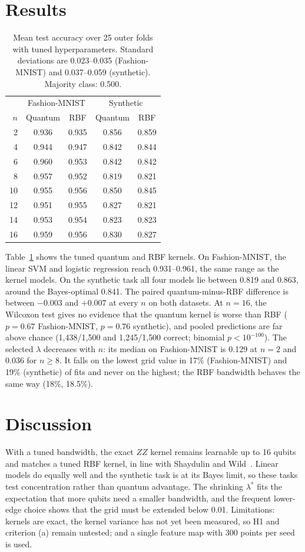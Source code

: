 \documentclass[conference]{IEEEtran}
\begin{document}
\section{Results}
\begin{table}[t]
\centering
\caption{Mean test accuracy over 25 outer folds with tuned hyperparameters. Standard deviations are 0.023--0.035 (Fashion-MNIST) and 0.037--0.059 (synthetic). Majority class: 0.500.}
\label{tab:accuracy}
\setlength{\tabcolsep}{6pt}
\begin{tabular}{rcccc}
\toprule
& \multicolumn{2}{c}{Fashion-MNIST} & \multicolumn{2}{c}{Synthetic} \\
$n$ & Quantum & RBF & Quantum & RBF \\
\midrule
2  & 0.936 & 0.935 & 0.856 & 0.859 \\
4  & 0.944 & 0.947 & 0.842 & 0.844 \\
6  & 0.960 & 0.953 & 0.842 & 0.842 \\
8  & 0.957 & 0.952 & 0.819 & 0.821 \\
10 & 0.955 & 0.956 & 0.850 & 0.845 \\
12 & 0.951 & 0.955 & 0.827 & 0.821 \\
14 & 0.953 & 0.954 & 0.823 & 0.823 \\
16 & 0.959 & 0.956 & 0.830 & 0.827 \\
\bottomrule
\end{tabular}
\end{table}

Table~\ref{tab:accuracy} shows the tuned quantum and RBF kernels. On Fashion-MNIST, the linear SVM and logistic regression reach 0.931--0.961, the same range as the kernel models. On the synthetic task all four models lie between 0.819 and 0.863, around the Bayes-optimal 0.841. The paired quantum-minus-RBF difference is between $-0.003$ and $+0.007$ at every $n$ on both datasets. At $n=16$, the Wilcoxon test gives no evidence that the quantum kernel is worse than RBF ($p=0.67$ Fashion-MNIST, $p=0.76$ synthetic), and pooled predictions are far above chance (1{,}438/1{,}500 and 1{,}245/1{,}500 correct; binomial $p<10^{-100}$). The selected $\lambda$ decreases with $n$: its median on Fashion-MNIST is 0.129 at $n=2$ and 0.036 for $n\geq8$. It falls on the lowest grid value in 17\% (Fashion-MNIST) and 19\% (synthetic) of fits and never on the highest; the RBF bandwidth behaves the same way (18\%, 18.5\%).

\section{Discussion}
With a tuned bandwidth, the exact $ZZ$ kernel remains learnable up to 16 qubits and matches a tuned RBF kernel, in line with Shaydulin and Wild~\cite{shaydulin2022bandwidth}. Linear models do equally well and the synthetic task is at its Bayes limit, so these tasks test concentration rather than quantum advantage. The shrinking $\lambda^{*}$ fits the expectation that more qubits need a smaller bandwidth, and the frequent lower-edge choice shows that the grid must be extended below 0.01. Limitations: kernels are exact, the kernel variance has not yet been measured, so H1 and criterion (a) remain untested; and a single feature map with 300 points per seed is used.
\end{document}
